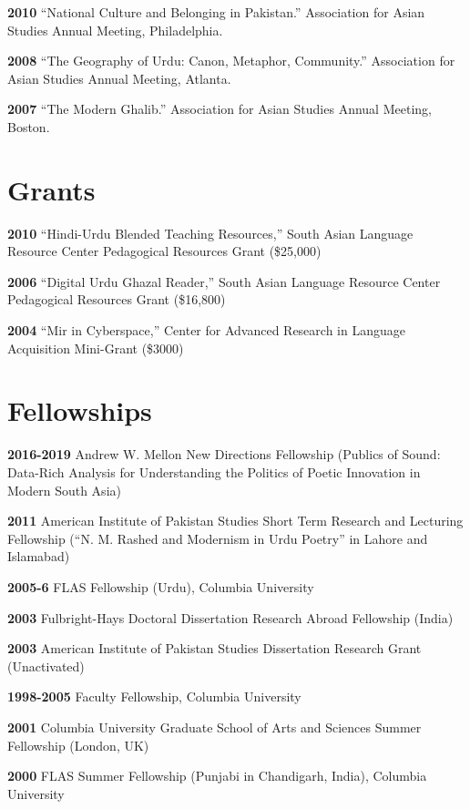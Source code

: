 \documentclass[letterpaper,12pt]{article}
\begin{document}
\textbf{2010}
“National Culture and Belonging in Pakistan.”
Association for Asian Studies Annual Meeting, Philadelphia.

\textbf{2008}
“The Geography of Urdu: Canon, Metaphor, Community.”
Association for Asian Studies Annual Meeting, Atlanta.

\textbf{2007}
“The Modern Ghalib.”
Association for Asian Studies Annual Meeting, Boston.


\section{Grants%
  \label{grants}%
}

\textbf{2010}
“Hindi-Urdu Blended Teaching Resources,”
South Asian Language Resource Center Pedagogical Resources Grant (\$25,000)

\textbf{2006}
“Digital Urdu Ghazal Reader,”
South Asian Language Resource Center Pedagogical Resources Grant (\$16,800)

\textbf{2004}
“Mir in Cyberspace,”
Center for Advanced Research in Language Acquisition Mini-Grant (\$3000)


\section{Fellowships%
  \label{fellowships}%
}

\textbf{2016-2019}
Andrew W. Mellon New Directions Fellowship
(\textquotedbl{}Publics of Sound:
Data-Rich Analysis for Understanding the Politics of Poetic Innovation
in Modern South Asia\textquotedbl{})

\textbf{2011}
American Institute of Pakistan Studies
Short Term Research and Lecturing Fellowship
(“N. M. Rashed and Modernism in Urdu Poetry” in Lahore and Islamabad)

\textbf{2005-6}
FLAS Fellowship (Urdu), Columbia University

\textbf{2003}
Fulbright-Hays Doctoral Dissertation Research Abroad Fellowship (India)

\textbf{2003}
American Institute of Pakistan Studies Dissertation Research Grant (Unactivated)

\textbf{1998-2005}
Faculty Fellowship, Columbia University

\textbf{2001}
Columbia University Graduate School of Arts and Sciences Summer Fellowship (London, UK)

\textbf{2000}
FLAS Summer Fellowship (Punjabi in Chandigarh, India), Columbia University
\end{document}
